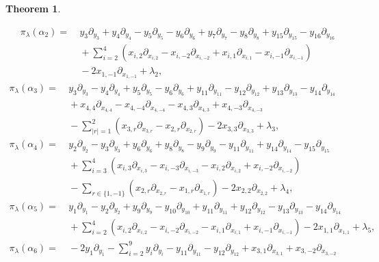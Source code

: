 \documentclass[12pt]{article}
\numberwithin{equation}{section}
\newtheorem{theorem}{Theorem}[section]
\theoremstyle{definition}
\theoremstyle{remark}
\begin{document}
\begin{theorem}
\begin{enumerate}[(i)]
\begin{align}
			\pi_{\lambda}(\alpha_2)=&\:y_3\partial_{y_3}+y_4\partial_{y_4}-y_5\partial_{y_5}-y_6\partial_{y_6}+y_7\partial_{y_7}-y_8\partial_{y_8}+y_{15}\partial_{y_{15}}-y_{16}\partial_{y_{16}}\nonumber\\
			&\:+\mathop{\textstyle\sum}\limits_{i=2}^4(x_{i,2}\partial_{x_{i,2}}-x_{i,-2}\partial_{x_{i,-2}}+x_{i,1}\partial_{x_{i,1}}-x_{i,-1}\partial_{x_{i,-1}})\nonumber\\
			&\:-2x_{1,-1}\partial_{x_{1,-1}}+\lambda_2,
		\end{align}
		\begin{align}
			\pi_{\lambda}(\alpha_3)=&\:y_3\partial_{y_3}-y_4\partial_{y_4}+y_{5}\partial_{y_5}-y_6\partial_{y_6}+y_{11}\partial_{y_{11}}-y_{12}\partial_{y_{12}}+y_{13}\partial_{y_{13}}-y_{14}\partial_{y_{14}}\nonumber\\
			&\:+x_{4,4}\partial_{x_{4,4}}-x_{4,-4}\partial_{x_{4,-4}}-x_{4,3}\partial_{x_{4,3}}+x_{4,-3}\partial_{x_{4,-3}}\nonumber\\
			&\:-\mathop{\textstyle\sum}\limits_{|r|=1}^2(x_{3,r}\partial_{x_{3,r}}-x_{2,r}\partial_{x_{2,r}})-2x_{3,3}\partial_{x_{3,3}}+\lambda_3,  \\
			\pi_{\lambda}(\alpha_4)=&\:y_2\partial_{y_2}-y_{3}\partial_{y_3}+y_6\partial_{y_6}+y_{8}\partial_{y_8}-y_9\partial_{y_9}-y_{11}\partial_{y_{11}}+y_{14}\partial_{y_{14}}-y_{15}\partial_{y_{15}}\nonumber\\
			&\:+\mathop{\textstyle\sum}\limits_{i=3}^4(x_{i,3}\partial_{x_{i,3}}-x_{i,-3}\partial_{x_{i,-3}}-x_{i,2}\partial_{x_{i,2}}+x_{i,-2}\partial_{x_{i,-2}})\nonumber\\
			&\:-\mathop{\textstyle\sum}\limits_{r\in\{1,-1\}}(x_{2,r}\partial_{x_{2,r}}-x_{1,r}\partial_{x_{1,r}})-2x_{2,2}\partial_{x_{2,2}}+\lambda_4,  \\
			\pi_{\lambda}(\alpha_5)=&\:y_1\partial_{y_{1}}-y_{2}\partial_{y_2}+y_9\partial_{y_9}-y_{10}\partial_{y_{10}}+y_{11}\partial_{y_{11}}+y_{12}\partial_{y_{12}}-y_{13}\partial_{y_{13}}-y_{14}\partial_{y_{14}}\nonumber\\
			&\:+\mathop{\textstyle\sum}\limits_{i=2}^4(x_{i,2}\partial_{x_{i,2}}-x_{i,-2}\partial_{x_{i,-2}}-x_{i,1}\partial_{x_{i,1}}+x_{i,-1}\partial_{x_{i,-1}})-2x_{1,1}\partial_{x_{1,1}}+\lambda_5,\label{3.101}\\
			\pi_{\lambda}(\alpha_6)=&\:-2y_1\partial_{y_{1}}-\mathop{\textstyle\sum}\limits_{i=2}^{9}y_i\partial_{y_i}-y_{11}\partial_{y_{11}}-y_{12}\partial_{y_{12}}+x_{3,1}\partial_{x_{3,1}}+x_{3,-2}\partial_{x_{3,-2}}\nonumber\\

\end{align}
\end{enumerate}
\end{theorem}
\end{document}
